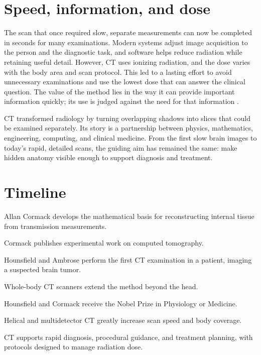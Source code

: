 \documentclass[12pt,oneside]{book}
\begin{document}
\section{Speed, information, and dose}
The scan that once required slow, separate measurements can now be completed
in seconds for many examinations. Modern systems adjust image acquisition
to the person and the diagnostic task, and software helps reduce radiation
while retaining useful detail. However, CT uses ionizing radiation, and
the dose varies with the body area and scan protocol. This led to a lasting
effort to avoid unnecessary examinations and use the lowest dose that can
answer the clinical question. The value of the method lies in the way it
can provide important information quickly; its use is judged against the
need for that information \cite{radiologyInfoDose,ctMilestones}.

CT transformed radiology by turning overlapping shadows into slices that
could be examined separately. Its story is a partnership between physics,
mathematics, engineering, computing, and clinical medicine. From the first
slow brain images to today's rapid, detailed scans, the guiding aim has
remained the same: make hidden anatomy visible enough to support diagnosis
and treatment.

\section*{Timeline}
\begin{description}[leftmargin=2.3cm,style=nextline]
  \item[1950s] Allan Cormack develops the mathematical basis for reconstructing internal tissue from transmission measurements.
  \item[1963--1964] Cormack publishes experimental work on computed tomography.
  \item[1971] Hounsfield and Ambrose perform the first CT examination in a patient, imaging a suspected brain tumor.
  \item[1974] Whole-body CT scanners extend the method beyond the head.
  \item[1979] Hounsfield and Cormack receive the Nobel Prize in Physiology or Medicine.
  \item[1990s] Helical and multidetector CT greatly increase scan speed and body coverage.
  \item[Today] CT supports rapid diagnosis, procedural guidance, and treatment planning, with protocols designed to manage radiation dose.
\end{description}
\end{document}
